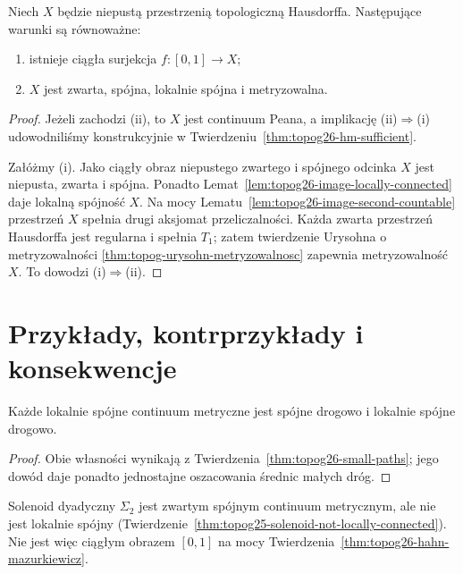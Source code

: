 \begin{twierdzenie}
\label{thm:topog26-hahn-mazurkiewicz}
Niech \(X\) będzie niepustą
przestrzenią topologiczną Hausdorffa.
Następujące warunki są równoważne:
\begin{enumerate}[label=\textup{(\roman*)}]
\item istnieje ciągła surjekcja
\(f\colon[0,1]\to X\);
\item \(X\) jest zwarta, spójna,
lokalnie spójna i metryzowalna.
\end{enumerate}
\end{twierdzenie}
\begin{proof}
Jeżeli zachodzi \textup{(ii)},
to \(X\) jest continuum Peana,
a implikację \textup{(ii)}\(\Rightarrow\)\textup{(i)}
udowodniliśmy konstrukcyjnie
w Twierdzeniu~\ref{thm:topog26-hm-sufficient}.

Załóżmy \textup{(i)}.
Jako ciągły obraz
niepustego zwartego
i spójnego odcinka
\(X\) jest niepusta,
zwarta i spójna.
Ponadto
Lemat~\ref{lem:topog26-image-locally-connected}
daje lokalną spójność \(X\).
Na mocy
Lematu~\ref{lem:topog26-image-second-countable}
przestrzeń \(X\)
spełnia drugi aksjomat
przeliczalności.
Każda zwarta przestrzeń
Hausdorffa jest regularna
i spełnia \(T_1\);
zatem twierdzenie Urysohna
o metryzowalności
\ref{thm:topog-urysohn-metryzowalnosc}
zapewnia metryzowalność \(X\).
To dowodzi \textup{(i)}\(\Rightarrow\)\textup{(ii)}.
\end{proof}

\section{Przykłady, kontrprzykłady i konsekwencje}
\label{sec:topog26-examples}

\begin{wniosek}
\label{cor:topog26-peano-path-connected}
Każde lokalnie spójne continuum metryczne
jest spójne drogowo i lokalnie spójne drogowo.
\end{wniosek}
\begin{proof}
Obie własności wynikają z
Twierdzenia~\ref{thm:topog26-small-paths};
jego dowód daje ponadto jednostajne
oszacowania średnic małych dróg.
\end{proof}

\begin{przyklad}
\label{ex:topog26-solenoid}
Solenoid dyadyczny \(\Sigma_2\) jest
zwartym spójnym continuum metrycznym,
ale nie jest lokalnie spójny
(Twierdzenie~\ref{thm:topog25-solenoid-not-locally-connected}).
Nie jest więc ciągłym obrazem
\([0,1]\) na mocy
Twierdzenia~\ref{thm:topog26-hahn-mazurkiewicz}.
\end{przyklad}

